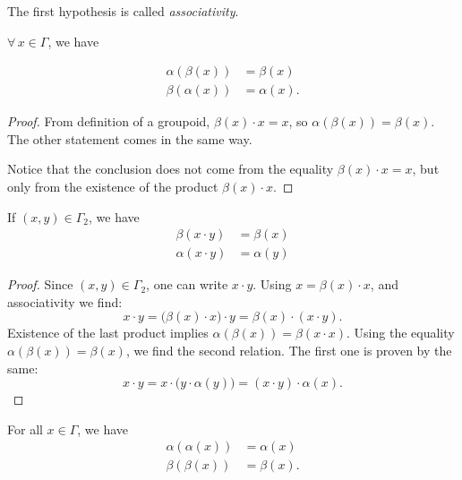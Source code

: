 The first hypothesis is called \emph{associativity}.

\begin{lemma}
	$\forall\,x\in\Gamma$, we have

	\begin{subequations}
		\begin{align}
			\alpha(\beta(x)) & =\beta(x)   \\
			\beta(\alpha(x)) & =\alpha(x).
		\end{align}
	\end{subequations}
\end{lemma}

\begin{proof}
	From definition of a groupoid, $\beta(x)\cdot x=x$, so $\alpha(\beta(x))=\beta(x)$. The other statement comes in the same way.

	Notice that the conclusion does not come from the equality $\beta(x)\cdot x=x$, but only from the existence of the product $\beta(x)\cdot x$.
\end{proof}

\begin{lemma}
	If $(x,y)\in\Gamma_{2}$, we have
	\begin{subequations}
		\begin{align}
			\beta(x\cdot y)  & =\beta(x)  \\
			\alpha(x\cdot y) & =\alpha(y)
		\end{align}
	\end{subequations}

\end{lemma}

\begin{proof}
	Since $(x,y)\in \Gamma_{2}$, one can write $x\cdot y$. Using $x=\beta(x)\cdot x$, and associativity we find:
	\[
		x\cdot y=\big( \beta(x)\cdot x \big)\cdot y=\beta(x)\cdot(x\cdot y).
	\]
	Existence of the last product implies $\alpha(\beta(x))=\beta(x\cdot x)$. Using the equality $\alpha(\beta(x))=\beta(x)$, we find the second relation. The first one is proven by the same:
	\[
		x\cdot y=x\cdot \big( y\cdot\alpha(y) \big)=(x\cdot y)\cdot \alpha(x).
	\]

\end{proof}

\begin{lemma}
	For all $x\in\Gamma$, we have
	\begin{subequations}
		\begin{align}
			\alpha(\alpha(x)) & =\alpha(x) \\
			\beta(\beta(x))   & =\beta(x).
		\end{align}
	\end{subequations}
\end{lemma}

